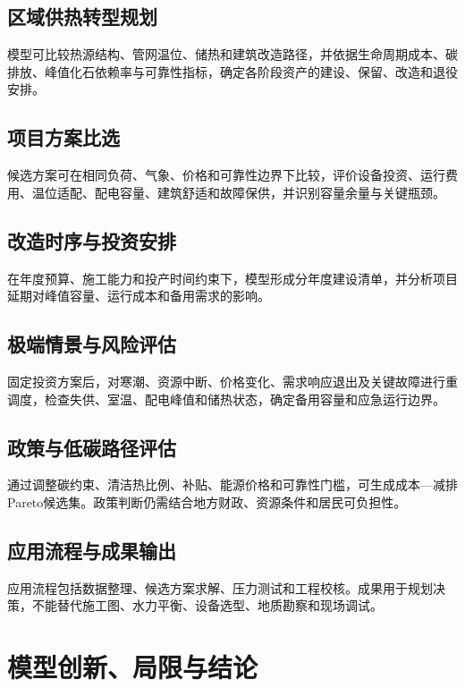 \documentclass[12pt,a4paper]{article}
\begin{document}
\subsection{区域供热转型规划}

模型可比较热源结构、管网温位、储热和建筑改造路径，并依据生命周期成本、碳排放、峰值化石依赖率与可靠性指标，确定各阶段资产的建设、保留、改造和退役安排。

\subsection{项目方案比选}

候选方案可在相同负荷、气象、价格和可靠性边界下比较，评价设备投资、运行费用、温位适配、配电容量、建筑舒适和故障保供，并识别容量余量与关键瓶颈。

\subsection{改造时序与投资安排}

在年度预算、施工能力和投产时间约束下，模型形成分年度建设清单，并分析项目延期对峰值容量、运行成本和备用需求的影响。

\subsection{极端情景与风险评估}

固定投资方案后，对寒潮、资源中断、价格变化、需求响应退出及关键故障进行重调度，检查失供、室温、配电峰值和储热状态，确定备用容量和应急运行边界。

\subsection{政策与低碳路径评估}

通过调整碳约束、清洁热比例、补贴、能源价格和可靠性门槛，可生成成本---减排Pareto候选集。政策判断仍需结合地方财政、资源条件和居民可负担性。

\subsection{应用流程与成果输出}

应用流程包括数据整理、候选方案求解、压力测试和工程校核。成果用于规划决策，不能替代施工图、水力平衡、设备选型、地质勘察和现场调试。

\clearpage
\section{模型创新、局限与结论}\label{minor:conclusion}
\end{document}
